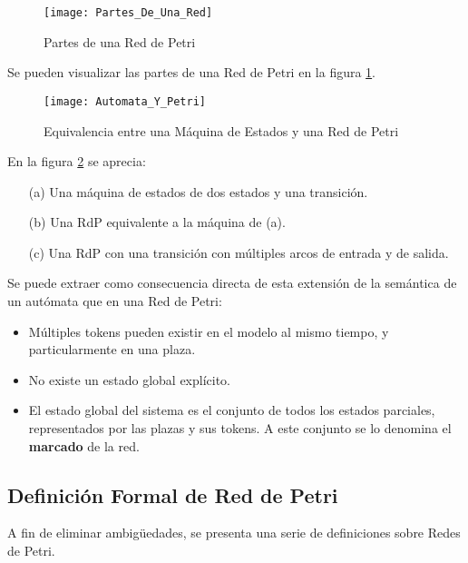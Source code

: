 \begin{figure}[h]
	\centering
	\texttt{[image: Partes\_De\_Una\_Red]}
	\caption{Partes de una Red de Petri}
	\label{fig:partes_de_una_red}
\end{figure}

Se pueden visualizar las partes de una Red de Petri en la figura
\ref{fig:partes_de_una_red}.\\

\begin{figure}[h]
    \centering
    \texttt{[image: Automata\_Y\_Petri]}
    \caption{Equivalencia entre una Máquina de Estados y una Red de Petri}
    \label{fig:automata_y_petri}
\end{figure}

En la figura \ref{fig:automata_y_petri} se aprecia:\\
\begin{itemize}
  \item[(a)] Una máquina de estados de dos estados y una transición.
  \item[(b)] Una RdP equivalente a la máquina de (a).
  \item[(c)] Una RdP con una transición con múltiples arcos de entrada y de
  salida.
\end{itemize}

Se puede extraer como consecuencia directa de esta extensión de la semántica de
un autómata que en una Red de Petri:
\begin{itemize}
  \item Múltiples tokens pueden existir en el modelo al mismo tiempo, y
  particularmente en una plaza.
  \item No existe un estado global explícito.
  \item El estado global del sistema es el conjunto de todos los estados
  parciales, representados por las plazas y sus tokens. A este conjunto se lo
  denomina el \textbf{marcado} de la red.
\end{itemize}

\subsection{Definición Formal de Red de Petri}
\label{def_formal_petri}
A fin de eliminar ambigüedades, se presenta una serie de definiciones sobre
Redes de Petri.

